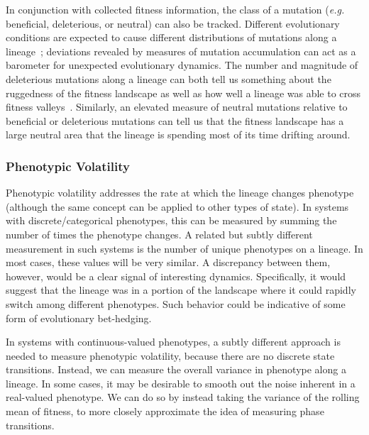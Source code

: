 \documentclass[letterpaper]{article}
\begin{document}
In conjunction with collected fitness information, the class of a mutation (\textit{e.g.} beneficial, deleterious, or neutral) can also be tracked. Different evolutionary conditions are expected to cause different distributions of mutations along a lineage~\citep{barrick2013genome}; deviations revealed by measures of mutation accumulation can act as a barometer for unexpected evolutionary dynamics.   
The number and magnitude of deleterious mutations along a lineage can both tell us something about the ruggedness of the fitness landscape as well as how well a lineage was able to cross fitness valleys~\citep{}. 
Similarly, an elevated measure of neutral mutations relative to beneficial or deleterious mutations can tell us that the fitness landscape has a large neutral area that the lineage is spending most of its time drifting around. 




\subsubsection{Phenotypic Volatility}

Phenotypic volatility addresses the rate at which the lineage changes phenotype (although the same concept can be applied to other types of state). In systems with discrete/categorical phenotypes, this can be measured by summing the number of times the phenotype changes. A related but subtly different measurement in such systems is the number of unique phenotypes on a lineage. In most cases, these values will be very similar. A discrepancy between them, however, would be a clear signal of interesting dynamics. Specifically, it would suggest that the lineage was in a portion of the landscape where it could rapidly switch among different phenotypes. Such behavior could be indicative of some form of evolutionary bet-hedging.

In systems with continuous-valued phenotypes, a subtly different approach is needed to measure phenotypic volatility, because there are no discrete state transitions. Instead, we can measure the overall variance in phenotype along a lineage. In some cases, it may be desirable to smooth out the noise inherent in a real-valued phenotype. We can do so by instead taking the variance of the rolling mean of fitness, to more closely approximate the idea of measuring phase transitions.
\end{document}
